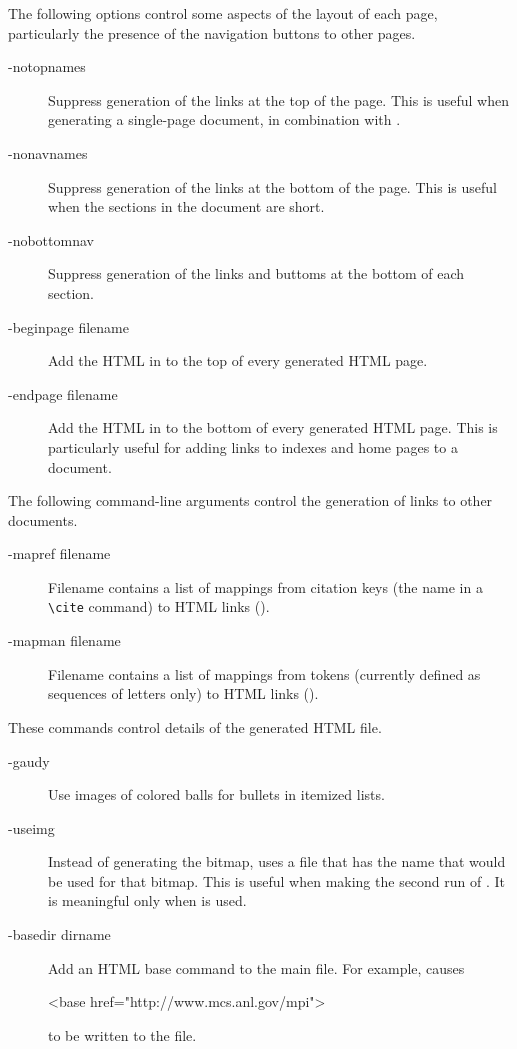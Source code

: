 \documentclass[twoside]{doctext/linfoem}
\begin{document}
The following options control some aspects of the layout of each page,
particularly the 
presence of the navigation buttons to other pages.
\begin{description}
\item[-notopnames]Suppress generation of the links at the top of the
page.  This is useful when generating a single-page document, in combination
with .

\item[-nonavnames]Suppress generation of the links at the bottom of the
page.  This is useful when the sections in the document are short.

\item[-nobottomnav]Suppress generation of the links and buttoms at the
bottom of each section.

\item[-beginpage filename]Add the HTML in  to the top of every
generated HTML page.

\item[-endpage filename]Add the HTML in  to the bottom of every
generated HTML page.  This is particularly useful for adding links to indexes
and home pages to a document.
\end{description}


The following command-line arguments control the generation of links to other
documents. 
\begin{description}

\item[-mapref filename]Filename contains a list of mappings from citation keys
(the name in a \verb+\cite+ command) to HTML links (). 

\item[-mapman filename]Filename contains a list of mappings from tokens
(currently defined as sequences of letters only) to HTML links  
().
\end{description}

These commands control details of the generated HTML file.

\begin{description}
\item[-gaudy]Use images of colored balls for
bullets in itemized lists.

\item[-useimg]Instead of generating the bitmap, uses a file that has the name
that would be used for that bitmap.  This
is useful when making the second run of .  It is meaningful only when
 is used.

\item[-basedir dirname]Add an HTML base command to the main file.
For example,  causes
\begin{example}
<base href="http://www.mcs.anl.gov/mpi">
\end{example}
to be written to the file.

\end{description}
\end{document}
